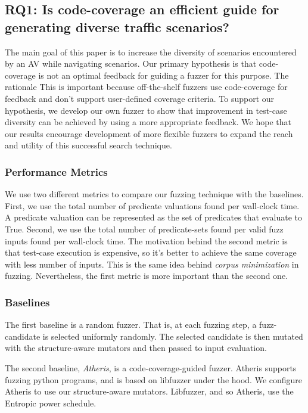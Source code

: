 \subsection{RQ1: Is code-coverage an efficient guide for generating diverse traffic scenarios?}

The main goal of this paper is to increase the diversity of scenarios encountered by an AV while navigating scenarios.
% 
Our primary hypothesis is that code-coverage is not an optimal feedback for guiding a fuzzer for this purpose.
%
The rationale 
%
This is important because off-the-shelf fuzzers use code-coverage for feedback and don't support user-defined coverage criteria.
%
To support our hypothesis, we develop our own fuzzer to show that improvement in test-case diversity can be achieved by using a more appropriate feedback.
%
We hope that our results encourage development of more flexible fuzzers to expand the reach and utility of this successful search technique.


\subsubsection{Performance Metrics}
We use two different metrics to compare our fuzzing technique with the baselines.
%
First, we use the total number of predicate valuations found per wall-clock time.
%
A predicate valuation can be represented as the set of predicates that evaluate to True.
%
Second, we use the total number of predicate-sets found per valid fuzz inputs found per wall-clock time.
%
The motivation behind the second metric is that test-case execution is expensive, so it's better to achieve the same coverage with less number of inputs.
%
This is the same idea behind \emph{corpus minimization} in fuzzing.
%
Nevertheless, the first metric is more important than the second one.


\subsubsection{Baselines}
The first baseline is a random fuzzer.
%
That is, at each fuzzing step, a fuzz-candidate is selected uniformly randomly.
%
The selected candidate is then mutated with the structure-aware mutators and then passed to input evaluation.


The second baseline, \emph{Atheris}, is a code-coverage-guided fuzzer.
%
Atheris supports fuzzing python programs, and is based on libfuzzer under the hood.
%
We configure Atheris to use our structure-aware mutators.
%
Libfuzzer, and so Atheris, use the Entropic power schedule.


